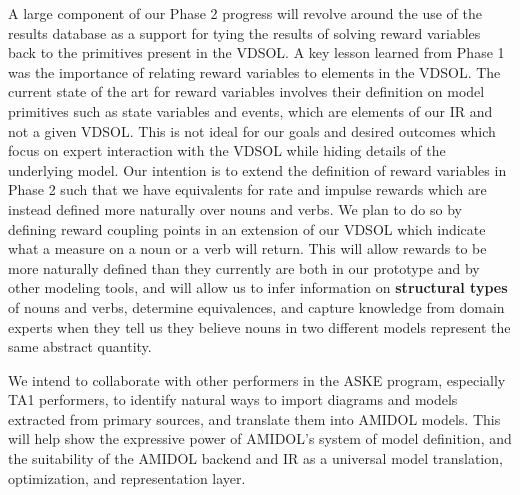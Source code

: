 \documentclass[11pt]{article}
\newcommand{\amidol}{\textsc{AMIDOL}}
\begin{document}
A large component of our Phase 2 progress will revolve around the use of the results database as a support for tying the results of solving reward variables back to the primitives present in the VDSOL.  A key lesson learned from Phase 1 was the importance of relating reward variables to elements in the VDSOL.  The current state of the art for reward variables involves their definition on model primitives such as state variables and events, which are elements of our IR and not a given VDSOL.  This is not ideal for our goals and desired outcomes which focus on expert interaction with the VDSOL while hiding details of the underlying model.  Our intention is to extend the definition of reward variables in Phase 2 such that we have equivalents for rate and impulse rewards which are instead defined more naturally over nouns and verbs.  We plan to do so by defining reward coupling points in an extension of our VDSOL which indicate what a measure on a noun or a verb will return.  This will allow rewards to be more naturally defined than they currently are both in our prototype and by other modeling tools, and will allow us to infer information on \textbf{structural types} of nouns and verbs, determine equivalences, and capture knowledge from domain experts when they tell us they believe nouns in two different models represent the same abstract quantity.

We intend to collaborate with other performers in the ASKE program, especially TA1 performers, to identify natural ways to import diagrams and models extracted from primary sources, and translate them into \amidol{} models.  This will help show the expressive power of \amidol{}'s system of model definition, and the suitability of the \amidol{} backend and IR as a universal model translation, optimization, and representation layer.


\end{document}
